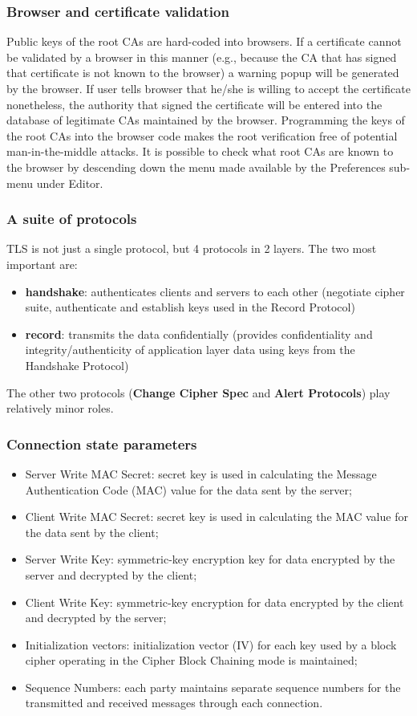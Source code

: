 \documentclass[a4paper, 10pt, titlepage]{article}
\begin{document}
\subsubsection{Browser and certificate validation}
Public keys of the root CAs are hard-coded into browsers. If a certificate cannot be validated by a browser in this manner (e.g., because the CA that has signed that certificate is not known to the browser) a warning popup will be generated by the browser. If user tells browser that he/she is willing to accept the certificate nonetheless, the authority that signed the certificate will be entered into the database of legitimate CAs maintained by the browser. Programming the keys of the root CAs into the browser code makes the root verification free of potential man-in-the-middle attacks. It is possible to check what root CAs are known to the browser by descending down the menu made available by the Preferences sub-menu under Editor.

\subsubsection{A suite of protocols}
TLS is not just a single protocol, but 4 protocols in 2 layers. The two most important are:
\begin{itemize}
\item \textbf{handshake}: authenticates clients and servers to each other (negotiate cipher suite, authenticate and establish keys used in the Record Protocol)
\item \textbf{record}: transmits the data confidentially (provides confidentiality and integrity/authenticity of application layer data using keys from the Handshake Protocol)
\end{itemize}
The other two protocols (\textbf{Change Cipher Spec} and \textbf{Alert Protocols}) play relatively minor roles.

\subsubsection{Connection state parameters}
\begin{itemize}
\item Server Write MAC Secret: secret key is used in calculating the Message Authentication Code (MAC) value for the data sent by the server;
\item Client Write MAC Secret: secret key is used in calculating the MAC value for the data sent by the client;
\item Server Write Key: symmetric-key encryption key for data encrypted by the server and decrypted by the client;
\item Client Write Key: symmetric-key encryption for data encrypted by the client and decrypted by the server;
\item Initialization vectors: initialization vector (IV) for each key used by a block cipher operating in the Cipher Block Chaining mode is maintained;
\item Sequence Numbers: each party maintains separate sequence numbers for the transmitted and received messages through each connection.
\end{itemize}
\end{document}
